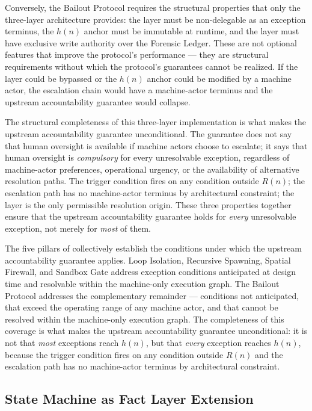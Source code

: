 Conversely, the Bailout Protocol requires the structural properties that only the \bxthree{} three-layer architecture provides: the \purpose{} layer must be non-delegable as an exception terminus, the $h(n)$ anchor must be immutable at runtime, and the \fact{} layer must have exclusive write authority over the Forensic Ledger. These are not optional features that improve the protocol's performance — they are structural requirements without which the protocol's guarantees cannot be realized. If the \purpose{} layer could be bypassed or the $h(n)$ anchor could be modified by a machine actor, the escalation chain would have a machine-actor terminus and the upstream accountability guarantee would collapse.

The structural completeness of this three-layer implementation is what makes the upstream accountability guarantee unconditional. The guarantee does not say that human oversight is available if machine actors choose to escalate; it says that human oversight is \emph{compulsory} for every unresolvable exception, regardless of machine-actor preferences, operational urgency, or the availability of alternative resolution paths. The trigger condition fires on any condition outside $R(n)$; the escalation path has no machine-actor terminus by architectural constraint; the \purpose{} layer is the only permissible resolution origin. These three properties together ensure that the upstream accountability guarantee holds for \emph{every} unresolvable exception, not merely for \emph{most} of them.

The five pillars of \bxthree{} collectively establish the conditions under which the upstream accountability guarantee applies. Loop Isolation, Recursive Spawning, Spatial Firewall, and Sandbox Gate address exception conditions anticipated at design time and resolvable within the machine-only execution graph. The Bailout Protocol addresses the complementary remainder — conditions not anticipated, that exceed the operating range of any machine actor, and that cannot be resolved within the machine-only execution graph. The completeness of this coverage is what makes the upstream accountability guarantee unconditional: it is not that \emph{most} exceptions reach $h(n)$, but that \emph{every} exception reaches $h(n)$, because the trigger condition fires on any condition outside $R(n)$ and the escalation path has no machine-actor terminus by architectural constraint.

\subsection{State Machine as Fact Layer Extension}\label{sec:state-machine-fact-layer}

